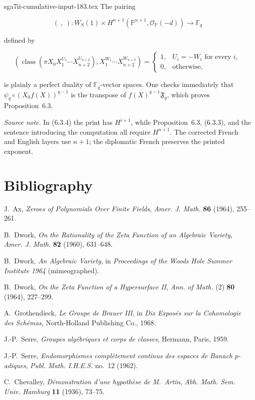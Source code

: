 \begin{filecontents*}{sga7ii-cumulative-input-183.tex}
The pairing

\begin{equation}\tag{6.3.6}
(\ ,\ ):
W_S(1)\times
H^{n+1}(\mathbb P^{n+1},\mathcal O_{\mathbb P}(-d))
\longrightarrow\mathbb F_q
\end{equation}

defined by

\begin{equation}\tag{6.3.7}
\left(
\operatorname{class}\!\left(
\pi X_0X_1^{U_1}\cdots X_{n+2}^{U_{n+2}}
\right),
X_1^{W_1}\cdots X_{n+2}^{W_{n+2}}
\right)
=
\begin{cases}
1,&U_i=-W_i\text{ for every }i,\\
0,&\text{otherwise},
\end{cases}
\end{equation}

is plainly a perfect duality of $\mathbb F_q$-vector spaces.  One checks
immediately that
$\psi_q\circ(X_0f(X))^{q-1}$ is the transpose of
$f(X)^{q-1}\mathfrak F_q$, which proves Proposition~6.3.

\medskip
\noindent\emph{Source note.}
In (6.3.4) the print has $H^{i+1}$, while Proposition~6.3, (6.3.3), and the
sentence introducing the computation all require $H^{n+1}$.  The corrected
French and English layers use $n+1$; the diplomatic French preserves the
printed exponent.

\section*{Bibliography}

\begin{enumerate}[label={[\arabic*]},leftmargin=2.4em]
\item J.~Ax, \emph{Zeroes of Polynomials Over Finite Fields},
  \emph{Amer. J. Math.} \textbf{86} (1964), 255--261.
\item B.~Dwork, \emph{On the Rationality of the Zeta Function of an Algebraic
  Variety}, \emph{Amer. J. Math.} \textbf{82} (1960), 631--648.
\item B.~Dwork, \emph{An Algebraic Variety}, in \emph{Proceedings of the
  Woods Hole Summer Institute 1964} (mimeographed).
\item B.~Dwork, \emph{On the Zeta Function of a Hypersurface II},
  \emph{Ann. of Math.} (2) \textbf{80} (1964), 227--299.
\item A.~Grothendieck, \emph{Le Groupe de Brauer III}, in
  \emph{Dix Exposés sur la Cohomologie des Schémas},
  North-Holland Publishing Co., 1968.
\item J.-P.~Serre, \emph{Groupes algébriques et corps de classes},
  Hermann, Paris, 1959.
\item J.-P.~Serre, \emph{Endomorphismes complètement continus des espaces de
  Banach $p$-adiques}, \emph{Publ. Math. I.H.E.S.} no.~12 (1962).
\item C.~Chevalley, \emph{Démonstration d'une hypothèse de M.~Artin},
  \emph{Abh. Math. Sem. Univ. Hamburg} \textbf{11} (1936), 73--75.
\end{enumerate}
\end{filecontents*}

